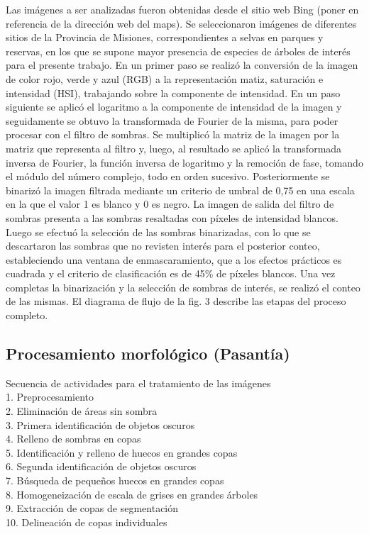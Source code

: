 Las imágenes a ser analizadas fueron obtenidas desde el sitio web Bing (poner en referencia de la dirección web del maps). Se seleccionaron imágenes de diferentes sitios de la Provincia de Misiones, correspondientes a selvas en parques y reservas, en los que se supone mayor presencia de especies de árboles de interés para el presente trabajo. 
En un primer paso se realizó la conversión de la imagen de color rojo, verde y azul (RGB) a la representación matiz, saturación e intensidad (HSI), trabajando sobre la componente de intensidad. En un paso siguiente se aplicó el logaritmo a la componente de intensidad de la imagen y seguidamente se obtuvo la transformada de Fourier de la misma, para poder procesar con el filtro de sombras. Se multiplicó la matriz de la imagen por la matriz que representa al filtro y, luego, al resultado se aplicó la transformada inversa de Fourier, la función inversa de logaritmo y la remoción de fase, tomando el módulo del número complejo, todo en orden sucesivo. Posteriormente se binarizó la imagen filtrada mediante un criterio de umbral de 0,75 en una escala en la que el valor 1 es blanco y 0 es negro. La imagen de salida del filtro de sombras presenta a las sombras resaltadas con píxeles de intensidad blancos. 
Luego se efectuó la selección de las sombras binarizadas, con lo que se descartaron las sombras que no revisten interés para el posterior conteo, estableciendo una ventana de enmascaramiento, que a los efectos prácticos es cuadrada y el criterio de clasificación es de 45\% de píxeles blancos. Una vez completas la binarización y la selección de sombras de interés, se realizó el conteo de las mismas. El diagrama de flujo de la fig. 3 describe las etapas del proceso completo. 


\color{cyan} %
\subsection{Procesamiento morfológico (Pasantía)}
Secuencia de actividades para el tratamiento de las imágenes\\
1. Preprocesamiento\\
2. Eliminación de áreas sin sombra\\
3. Primera identificación de objetos oscuros\\
4. Relleno de sombras en copas\\
5. Identificación y relleno de huecos en grandes copas\\
6. Segunda identificación de objetos oscuros\\
7. Búsqueda de pequeños huecos en grandes copas\\
8. Homogeneización de escala de grises en grandes árboles\\
9. Extracción de copas de segmentación\\
10.  Delineación de copas individuales\\

